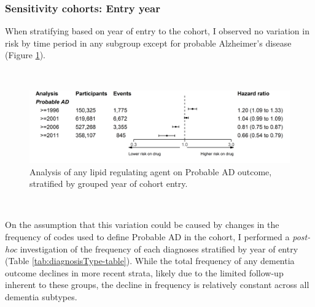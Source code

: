 \documentclass[a4paper, twoside]{templates/ociamthesis}
\begin{document}
\hypertarget{sensitivity-cohorts-entry-year}{%
\subsubsection{Sensitivity cohorts: Entry year}\label{sensitivity-cohorts-entry-year}}

When stratifying based on year of entry to the cohort, I observed no variation in risk by time period in any subgroup except for probable Alzheimer's disease (Figure \ref{fig:diagnosisTypeFig}).

~





\begin{figure}[H]
\includegraphics[width=1\linewidth]{figures/cprd-analysis/forester_cohort_entry} \caption[Sensitivty analus]{Analysis of any lipid regulating agent on Probable AD outcome, stratified by grouped year of cohort entry.}\label{fig:diagnosisTypeFig}
\end{figure}

~

On the assumption that this variation could be caused by changes in the frequency of codes used to define Probable AD in the cohort, I performed a \emph{post-hoc} investigation of the frequency of each diagnoses stratified by year of entry (Table \ref{tab:diagnosisType-table}). While the total frequency of any dementia outcome declines in more recent strata, likely due to the limited follow-up inherent to these groups, the decline in frequency is relatively constant across all dementia subtypes.

~
\end{document}
